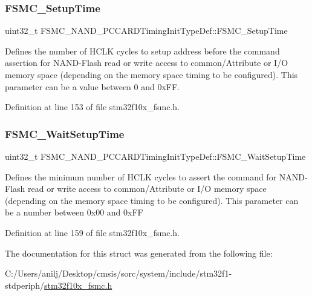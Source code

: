 \subsubsection{\texorpdfstring{F\+S\+M\+C\+\_\+\+Setup\+Time}{FSMC\_SetupTime}}
{\footnotesize\ttfamily uint32\+\_\+t F\+S\+M\+C\+\_\+\+N\+A\+N\+D\+\_\+\+P\+C\+C\+A\+R\+D\+Timing\+Init\+Type\+Def\+::\+F\+S\+M\+C\+\_\+\+Setup\+Time}

Defines the number of H\+C\+LK cycles to setup address before the command assertion for N\+A\+N\+D-\/\+Flash read or write access to common/\+Attribute or I/O memory space (depending on the memory space timing to be configured). This parameter can be a value between 0 and 0x\+FF. 

Definition at line 153 of file stm32f10x\+\_\+fsmc.\+h.

\mbox{\label{struct_f_s_m_c___n_a_n_d___p_c_c_a_r_d_timing_init_type_def_a99a7d54ed2674faa5a4e0f2669812855}} 
\subsubsection{\texorpdfstring{F\+S\+M\+C\+\_\+\+Wait\+Setup\+Time}{FSMC\_WaitSetupTime}}
{\footnotesize\ttfamily uint32\+\_\+t F\+S\+M\+C\+\_\+\+N\+A\+N\+D\+\_\+\+P\+C\+C\+A\+R\+D\+Timing\+Init\+Type\+Def\+::\+F\+S\+M\+C\+\_\+\+Wait\+Setup\+Time}

Defines the minimum number of H\+C\+LK cycles to assert the command for N\+A\+N\+D-\/\+Flash read or write access to common/\+Attribute or I/O memory space (depending on the memory space timing to be configured). This parameter can be a number between 0x00 and 0x\+FF 

Definition at line 159 of file stm32f10x\+\_\+fsmc.\+h.



The documentation for this struct was generated from the following file\+:\begin{DoxyCompactItemize}
\item 
C\+:/\+Users/anilj/\+Desktop/cmsis/sorc/system/include/stm32f1-\/stdperiph/\hyperlink{stm32f10x__fsmc_8h}{stm32f10x\+\_\+fsmc.\+h}\end{DoxyCompactItemize}
